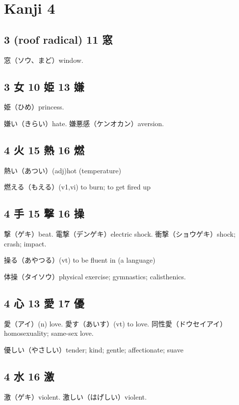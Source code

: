 \chapter{Kanji 4}

\section{3 (roof radical) 11 窓}

窓（ソウ、まど）window.

\section{3 女 10 姫 13 嫌}

姫（ひめ）princess.

嫌い（きらい）hate.
嫌悪感（ケンオカン）aversion.

\section{4 火 15 熱 16 燃}

熱い（あつい）(adj)hot (temperature)

燃える（もえる）(v1,vi) to burn; to get fired up

\section{4 手 15 撃 16 操}

撃（ゲキ）beat.
電撃（デンゲキ）electric shock.
衝撃（ショウゲキ）shock; crash; impact.

操る（あやつる）(vt) to be fluent in (a language)

体操（タイソウ）physical exercise; gymnastics; calisthenics.

\section{4 心 13 愛 17 優}

愛（アイ）(n) love.
愛す（あいす）(vt) to love.
同性愛（ドウセイアイ）homosexuality; same-sex love.

優しい（やさしい）tender; kind; gentle; affectionate; suave

\section{4 水 16 激}

激（ゲキ）violent.
激しい（はげしい）violent.

